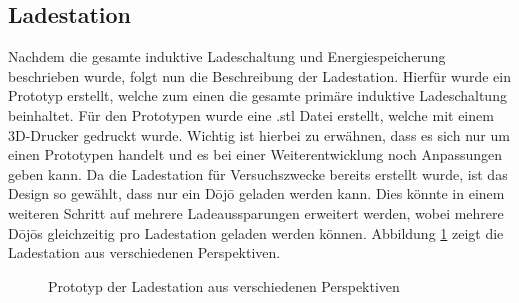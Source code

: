 \subsection{Ladestation} \label{sec:ladestation}

Nachdem die gesamte induktive Ladeschaltung und Energiespeicherung beschrieben wurde, folgt nun die Beschreibung der Ladestation. Hierfür wurde ein Prototyp erstellt, welche zum einen die gesamte primäre induktive Ladeschaltung beinhaltet. Für den Prototypen wurde eine .stl Datei erstellt, welche mit einem 3D-Drucker gedruckt wurde. Wichtig ist hierbei zu erwähnen, dass es sich nur um einen Prototypen handelt und es bei einer Weiterentwicklung noch Anpassungen geben kann. Da die Ladestation für Versuchszwecke bereits erstellt wurde, ist das Design so gewählt, dass nur ein Dōjō geladen werden kann. Dies könnte in einem weiteren Schritt auf mehrere Ladeaussparungen erweitert werden, wobei mehrere Dōjōs gleichzeitig pro Ladestation geladen werden können. Abbildung \ref{fig:Prototyp} zeigt die Ladestation aus verschiedenen Perspektiven.

\begin{figure}[htbp]
	\centering
	\quad
	\quad
	\caption[Prototyp Ladestation]{Prototyp der Ladestation aus verschiedenen Perspektiven}
	\label{fig:Prototyp}
\end{figure}

